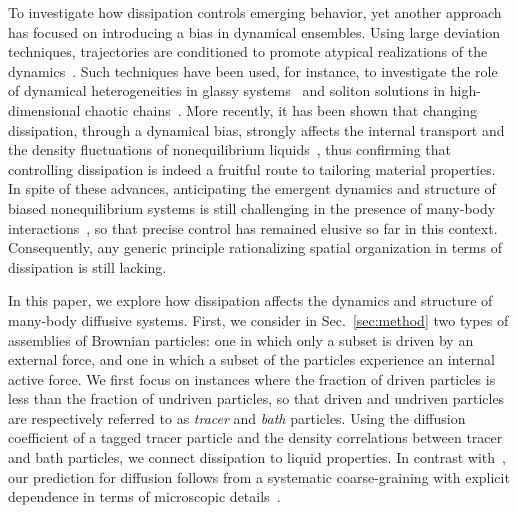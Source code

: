 \documentclass[superscriptaddress, twocolumn, prx, longbibliography, nofootinbib]{revtex4-1}
\begin{document}
To investigate how dissipation controls emerging behavior, yet another approach has focused on introducing a bias in dynamical ensembles. Using large deviation techniques, trajectories are conditioned to promote atypical realizations of the dynamics~\cite{Touchette2009, Jack2010}. Such techniques have been used, for instance, to investigate the role of dynamical heterogeneities in glassy systems~\cite{garrahan2007, Hedges2009, Pitard2011, Speck2012, Bodineau2012a, Limmer2014, Jack2017} and soliton solutions in high-dimensional chaotic chains~\cite{tailleur2007probing, laffargue2013}. More recently, it has been shown that changing dissipation, through a dynamical bias, strongly affects the internal transport and the density fluctuations of nonequilibrium liquids~\cite{Cagnetta2017, Nemoto2019}, thus confirming that controlling dissipation is indeed a fruitful route to tailoring material properties. In spite of these advances, anticipating the emergent dynamics and structure of biased nonequilibrium systems is still challenging in the presence of many-body interactions~\cite{Chetrite2013, Jack2010}, so that precise control has remained elusive so far in this context. Consequently, any generic principle rationalizing spatial organization in terms of dissipation is still lacking.


In this paper, we explore how dissipation affects the dynamics and structure of many-body diffusive systems. First, we consider in Sec.~\ref{sec:method} two types of assemblies of Brownian particles: one in which only a subset is driven by an external force, and one in which a subset of the particles experience an internal active force. We first focus on instances where the fraction of driven particles is less than the fraction of undriven particles, so that driven and undriven particles are respectively referred to as {\it tracer} and {\it bath} particles. Using the diffusion coefficient of a tagged tracer particle and the density correlations between tracer and bath particles, we connect dissipation to liquid properties. In contrast with~\cite{delJunco2018}, our prediction for diffusion follows from a systematic coarse-graining with explicit dependence in terms of microscopic details~\cite{Dean1996, Demery2011, Demery2014}.
\end{document}
